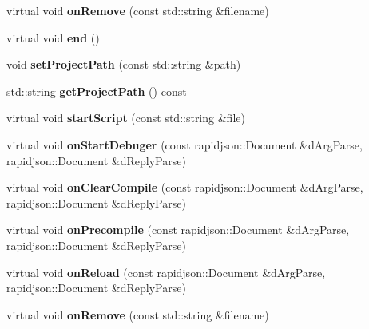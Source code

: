 \begin{DoxyCompactItemize}
virtual void {\bfseries on\+Remove} (const std\+::string \&filename)
\item 
\mbox{\label{classRuntimeProtocol_a1d343d258586d10c9a03dffee3fde93d}} 
virtual void {\bfseries end} ()
\item 
\mbox{\label{classRuntimeProtocol_ab6e6f0b9a75e3ab642846491324ac7de}} 
void {\bfseries set\+Project\+Path} (const std\+::string \&path)
\item 
\mbox{\label{classRuntimeProtocol_a1614a070642e18076d5c38e56bf5613d}} 
std\+::string {\bfseries get\+Project\+Path} () const
\item 
\mbox{\label{classRuntimeProtocol_a8c2c8215ff7bd15b09dfed3ab0d6f802}} 
virtual void {\bfseries start\+Script} (const std\+::string \&file)
\item 
\mbox{\label{classRuntimeProtocol_a60ea301c32e9d38fd5142454a598f617}} 
virtual void {\bfseries on\+Start\+Debuger} (const rapidjson\+::\+Document \&d\+Arg\+Parse, rapidjson\+::\+Document \&d\+Reply\+Parse)
\item 
\mbox{\label{classRuntimeProtocol_a531c654381154466d649072f7982e656}} 
virtual void {\bfseries on\+Clear\+Compile} (const rapidjson\+::\+Document \&d\+Arg\+Parse, rapidjson\+::\+Document \&d\+Reply\+Parse)
\item 
\mbox{\label{classRuntimeProtocol_ab8d03f8bc50daa2968efe59b1fbafa63}} 
virtual void {\bfseries on\+Precompile} (const rapidjson\+::\+Document \&d\+Arg\+Parse, rapidjson\+::\+Document \&d\+Reply\+Parse)
\item 
\mbox{\label{classRuntimeProtocol_ac31f4a64157412f531ef92557bdd2f16}} 
virtual void {\bfseries on\+Reload} (const rapidjson\+::\+Document \&d\+Arg\+Parse, rapidjson\+::\+Document \&d\+Reply\+Parse)
\item 
\mbox{\label{classRuntimeProtocol_a2499779a0d131c005ca44d4ccf1d589e}} 
virtual void {\bfseries on\+Remove} (const std\+::string \&filename)
\end{DoxyCompactItemize}
